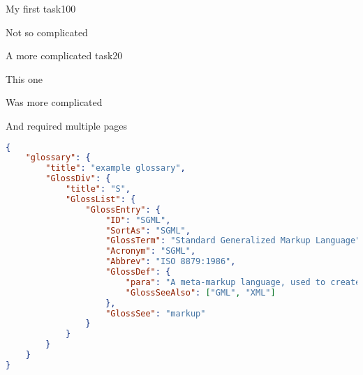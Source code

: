 \begin{task}{My first task}{100}

    Not so complicated 

\end{task}

\begin{task}{A more complicated task}{20}

    This one

    \pagebreak

    Was more complicated 

    \pagebreak

    And required multiple pages
\end{task}



\begin{frame}[containsverbatim]
    \begin{lstlisting}[language=json,firstnumber=1,basicstyle=\tiny]
{
    "glossary": {
        "title": "example glossary",
		"GlossDiv": {
            "title": "S",
			"GlossList": {
                "GlossEntry": {
                    "ID": "SGML",
					"SortAs": "SGML",
					"GlossTerm": "Standard Generalized Markup Language",
					"Acronym": "SGML",
					"Abbrev": "ISO 8879:1986",
					"GlossDef": {
                        "para": "A meta-markup language, used to create markup languages such as DocBook.",
						"GlossSeeAlso": ["GML", "XML"]
                    },
					"GlossSee": "markup"
                }
            }
        }
    }
}
    \end{lstlisting}
\end{frame}

